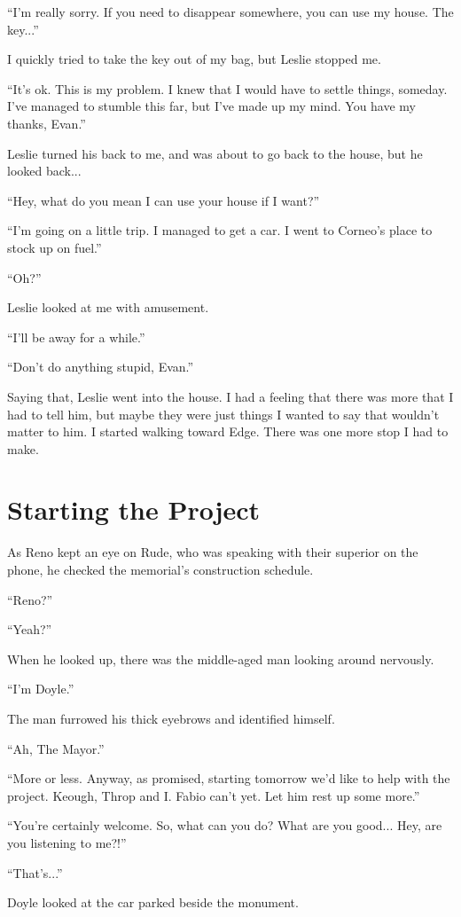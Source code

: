 \documentclass[oneside]{book}
\begin{document}
“I’m really sorry. If you need to disappear somewhere, you can use my house. The key...”

I quickly tried to take the key out of my bag, but Leslie stopped me.

“It’s ok. This is my problem. I knew that I would have to settle things, someday. I’ve managed to stumble this far, but I’ve made up my mind. You have my thanks, Evan.”

Leslie turned his back to me, and was about to go back to the house, but he looked back...

“Hey, what do you mean I can use your house if I want?”

“I’m going on a little trip. I managed to get a car. I went to Corneo’s place to stock up on fuel.”

“Oh?”

Leslie looked at me with amusement.

“I’ll be away for a while.”

“Don’t do anything stupid, Evan.”

Saying that, Leslie went into the house. I had a feeling that there was more that I had to tell him, but maybe they were just things I wanted to say that wouldn’t matter to him. I started walking toward Edge. There was one more stop I had to make.

\chapter{Starting the Project}
As Reno kept an eye on Rude, who was speaking with their superior on the phone, he checked the memorial’s construction schedule.

“Reno?”

“Yeah?”

When he looked up, there was the middle-aged man looking around nervously.

“I’m Doyle.”

The man furrowed his thick eyebrows and identified himself.

“Ah, The Mayor.”

“More or less. Anyway, as promised, starting tomorrow we’d like to help with the project. Keough, Throp and I. Fabio can’t yet. Let him rest up some more.”

“You’re certainly welcome. So, what can you do? What are you good... Hey, are you listening to me?!”

“That’s...”

Doyle looked at the car parked beside the monument.
\end{document}
